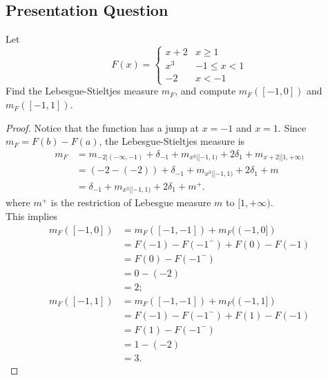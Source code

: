 \documentclass[class=book, crop=false]{standalone}
\begin{document}
        \subsection{Presentation Question}
        \begin{question}
            Let
            \begin{equation*}
                F(x) = \begin{cases}
                    x + 2 & x \geq 1 \\
                    x^3 & -1 \leq x < 1 \\
                    -2 & x < -1
                \end{cases}
            \end{equation*}
            Find the Lebesgue-Stieltjes measure $m_F$, and compute $m_F([-1, 0])$ and $m_F([-1, 1])$.
        \end{question}
        \begin{proof}
            Notice that the function has a jump at $x = -1$ and $x = 1$. Since $m_F = F(b) - F(a)$, the Lebesgue-Stieltjes measure is
            \begin{align*}
                m_F &= m_{-2 | (-\infty, -1)} + \delta_{-1} + m_{x^3 | [-1, 1)} + 2\delta_1 + m_{x + 2 | [1, +\infty)} \\
                &= (-2 - (-2)) + \delta_{-1} + m_{x^3 | [-1, 1)} + 2\delta_1 + m \\
                &= \delta_{-1} + m_{x^3 | [-1, 1)} + 2\delta_1 + m^+.
            \end{align*}
            where $m^+$ is the restriction of Lebesgue measure $m$ to $[1, +\infty)$. \\
            This implies
            \begin{align*}
                m_F([-1, 0]) &= m_F([-1, -1]) + m_F((-1, 0]) \\
                &= F(-1) - F(-1^-) + F(0) - F(-1) \\
                &= F(0) - F(-1^{-}) \\
                &= 0 - (-2) \\
                &= 2; \\
                m_F([-1, 1]) &= m_F([-1, -1]) + m_F((-1, 1]) \\
                &= F(-1) - F(-1^-) + F(1) - F(-1) \\
                &= F(1) - F(-1^{-}) \\
                &= 1 - (-2) \\
                &= 3.
            \end{align*}
        \end{proof}
\end{document}
